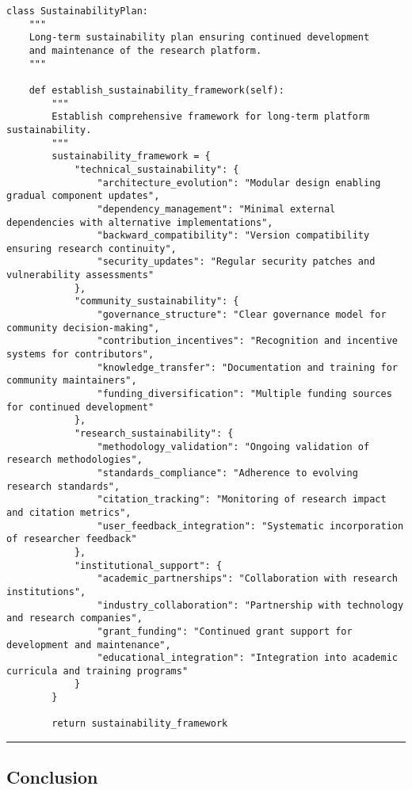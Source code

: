 \documentclass[12pt,a4paper]{article}
\begin{document}
\begin{verbatim}
class SustainabilityPlan:
    """
    Long-term sustainability plan ensuring continued development
    and maintenance of the research platform.
    """
    
    def establish_sustainability_framework(self):
        """
        Establish comprehensive framework for long-term platform sustainability.
        """
        sustainability_framework = {
            "technical_sustainability": {
                "architecture_evolution": "Modular design enabling gradual component updates",
                "dependency_management": "Minimal external dependencies with alternative implementations",
                "backward_compatibility": "Version compatibility ensuring research continuity",
                "security_updates": "Regular security patches and vulnerability assessments"
            },
            "community_sustainability": {
                "governance_structure": "Clear governance model for community decision-making",
                "contribution_incentives": "Recognition and incentive systems for contributors",
                "knowledge_transfer": "Documentation and training for community maintainers",
                "funding_diversification": "Multiple funding sources for continued development"
            },
            "research_sustainability": {
                "methodology_validation": "Ongoing validation of research methodologies",
                "standards_compliance": "Adherence to evolving research standards",
                "citation_tracking": "Monitoring of research impact and citation metrics",
                "user_feedback_integration": "Systematic incorporation of researcher feedback"
            },
            "institutional_support": {
                "academic_partnerships": "Collaboration with research institutions",
                "industry_collaboration": "Partnership with technology and research companies",
                "grant_funding": "Continued grant support for development and maintenance",
                "educational_integration": "Integration into academic curricula and training programs"
            }
        }
        
        return sustainability_framework
\end{verbatim}

\hrule

\subsection{Conclusion}
\end{document}
